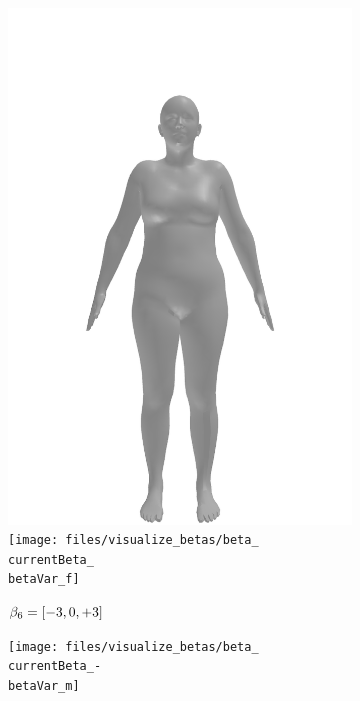 \begin{figure}[ht!]
\begin{subfigure}{\betaWidth}
        \includegraphics[width=\imgWidth]{files/visualize_betas/baseline_f}
        \texttt{[image: files/visualize\_betas/beta\_\\currentBeta\_\\betaVar\_f]}
        \caption{$\beta_6 = [-3, 0, +3]$}
    \end{subfigure}
    \begin{subfigure}{\betaWidth}
        \def\currentBeta{6}
        \centering
        \texttt{[image: files/visualize\_betas/beta\_\\currentBeta\_-\\betaVar\_m]}

\end{subfigure}
\end{figure}
